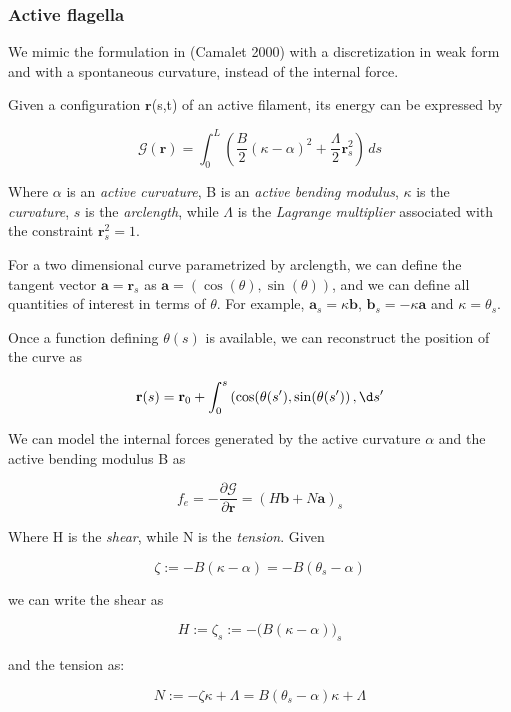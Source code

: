 
\subsubsection{Active flagella}
We mimic the formulation in (Camalet 2000) with a discretization in weak form and with a spontaneous curvature, instead of the internal force.




Given a configuration $\mathbf{r}$(s,t) of an active filament, its energy can be expressed by

\[\mathcal{G}(\mathbf{r}) = \int_0^L \left( \frac{B}{2}(\kappa-\alpha)^2 +
  \frac{\Lambda}{2} \mathbf{r}_s^2 \right) \,d s\]

Where $\alpha$ is an \emph{active curvature}, B is an \emph{active
  bending modulus}, $\kappa$ is the \emph{curvature}, $s$ is the
\emph{arclength}, while $\Lambda$ is the \emph{Lagrange multiplier}
associated with the constraint $\mathbf{r}_s^2 = 1$.

For a two dimensional curve parametrized by arclength, we can define
the tangent vector $\mathbf{a} = \mathbf{r}_s$ as $\mathbf{a} = (\cos(\theta), \sin(\theta))$, and
we can define all quantities of interest in terms of $\theta$. For
example, $\mathbf{a}_s = \kappa \mathbf{b}$, $\mathbf{b}_s = -\kappa \mathbf{a}$ and $\kappa = \theta_s$.

Once a function defining \(\theta(s)\) is available, we can reconstruct
the position of the curve as

\[\mathbf{r}(s) = \mathbf{r}_0 + \int_0^s \left(\cos(\theta(s'), \sin(\theta(s') \right)
,\d s'\]

We can model the internal forces generated by the active curvature
$\alpha$ and the active bending modulus B as

\[f_e = -\frac{\partial \mathcal{G}}{\partial \mathbf{r}} = (H \mathbf{b} + N \mathbf{a})_s\]

Where H is the \emph{shear}, while N is the
\emph{tension}. Given 

\[\zeta := -B(\kappa - \alpha) = -B(\theta_s - \alpha)\]

we can write the shear as

\[H := \zeta_s := -\big( B(\kappa - \alpha) \big)_s\]

and the tension as:

\[N := -\zeta\kappa + \Lambda = B(\theta_s-\alpha)\kappa +\Lambda\]

\label{sec:resist-force-theory}



